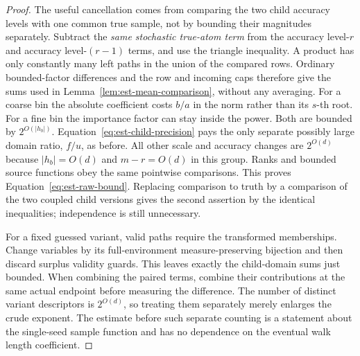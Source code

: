\documentclass[11pt]{article}
\numberwithin{equation}{section}
\theoremstyle{definition}
\theoremstyle{remark}
\begin{document}
\begin{proof}
The useful cancellation comes from comparing the two child accuracy levels with one common true sample, not by bounding their magnitudes separately. Subtract the \emph{same stochastic true-atom term} from the accuracy level-${r}$
and accuracy level-$({r}-1)$ terms, and use the triangle inequality.  A product has
only constantly many left paths in the union of the compared rows.
Ordinary bounded-factor differences and the row and incoming caps
therefore give the sums used in
Lemma~\ref{lem:est-mean-comparison}, without any averaging.  For a coarse
bin the absolute coefficient costs $b/a$ in the norm rather than its
$s$-th root.  For a fine bin the importance factor can stay inside the
power.  Both are bounded by $2^{O(|h_b|)}$.  Equation~\eqref{eq:est-child-precision}
pays the only separate possibly large domain ratio, $f/u$, as before.
All other scale and accuracy changes are $2^{O(d)}$ because
$|h_b|=O(d)$ and ${m}-{r}=O(d)$ in this group.  Ranks and bounded source
functions obey the same pointwise comparisons.  This proves
Equation~\eqref{eq:est-raw-bound}.  Replacing comparison to truth by a
comparison of the two coupled child versions gives the second assertion
by the identical inequalities; independence is still unnecessary.

For a fixed guessed variant, valid paths require the transformed
memberships.  Change variables by its full-environment measure-preserving
bijection and then discard surplus validity guards.  This leaves exactly
the child-domain sums just bounded.  When combining the paired terms,
combine their contributions at the same actual endpoint before measuring
the difference.  The number of distinct variant descriptors is
$2^{O(d)}$, so treating them separately merely enlarges the crude exponent.
The estimate before such separate counting is a statement about the
single-seed sample function and has no dependence on the eventual walk
length coefficient.
\end{proof}
\end{document}
